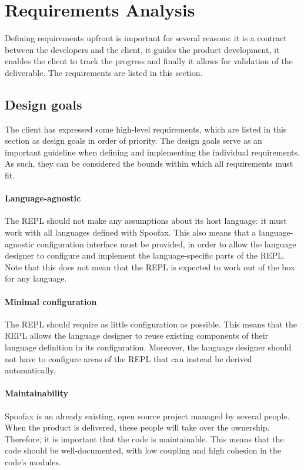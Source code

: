 \section{Requirements Analysis}
\label{sec:requirement-analysis}

Defining requirements upfront is important for several reasons: it is a contract
between the developers and the client, it guides the product development, it
enables the client to track the progress and finally it allows for validation of the
deliverable. The requirements are listed in this section.

\subsection{Design goals}
\label{ssec:goals}

The client has expressed some high-level requirements, which are listed in this
section as design goals in order of priority. The design goals serve as an
important guideline when defining and implementing the individual requirements. As
such, they can be considered the bounds within which all requirements must fit.

\paragraph{Language-agnostic} The REPL should not make any assumptions about its
host language: it must work with all languages defined with Spoofax. This also
means that a language-agnostic configuration interface must be provided, in
order to allow the language designer to configure and implement the
language-specific parts of the REPL. Note that this does not mean that the REPL
is expected to work out of the box for any language.

\paragraph{Minimal configuration} The REPL should require as little
configuration as possible. This means that the REPL allows the
language designer to reuse existing components of their language
definition in its configuration. Moreover, the language
designer should not have to configure areas of the REPL that can
instead be derived automatically.

\paragraph{Maintainability} Spoofax is an already existing, open source project
managed by several people. When the product is delivered, these people will take
over the ownership. Therefore, it is important that the code is
maintainable. This means that the code should be well-documented, with low
coupling and high cohesion in the code's modules.

